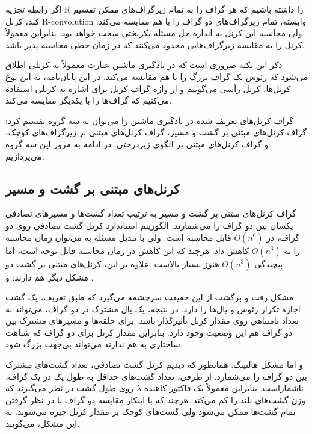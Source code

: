 اگر رابطه تجزیه R را داشته باشیم که هر گراف را به تمام زیرگراف‌های ممکن تقسیم کند، کرنل R-convolution وابسته، تمام زیرگراف‌های دو گراف را با هم مقایسه می‌کند. ولی محاسبه این کرنل به اندازه حل مسئله یکریختی سخت خواهد بود. بنابراین معمولاً کرنل را به مقایسه زیرگراف‌هایی محدود می‌کنند که در زمان خطی محاسبه پذیر باشد.

ذکر این نکته ضروری است که در یادگیری ماشین عبارت  معمولاً به کرنلی اطلاق می‌شود که رئوس یک گراف بزرگ را با هم مقایسه می‌کند. در این پایان‌نامه، به این نوع کرنل‌ها، کرنل رأسی می‌گوییم و از واژه گراف کرنل برای اشاره به کرنلی استفاده می‌کنیم که گراف‌ها را با یکدیگر مقایسه می‌کند.

گراف کرنل‌های تعریف شده در یادگیری ماشین را می‌توان به سه گروه تقسیم کرد: گراف کرنل‌های مبتنی بر گشت و مسیر، گراف کرنل‌های مبتنی بر زیرگراف‌های کوچک، و گراف کرنل‌های مبتنی بر الگوی زیردرختی. در ادامه به مرور این سه گروه می‌پردازیم.

\subsection{کرنل‌های مبتنی بر گشت و مسیر}\label{sec:random-walk-kernels}
گراف کرنل‌های مبتنی بر گشت و مسیر به ترتیب تعداد گشت‌ها و مسیرهای تصادفی یکسان بین دو گراف را می‌شمارند. الگوریتم استاندارد کرنل گشت تصادفی روی دو گراف، در $O(n^6)$  قابل محاسبه است. ولی با تبدیل مسئله به  می‌توان زمان محاسبه را به $O(n^3)$ کاهش داد. هرچند که این کاهش در زمان محاسبه قابل توجه است، اما پیچیدگی $O(n^3)$ هنوز بسیار بالاست. علاوه بر این، کرنل‌های مبتنی بر گشت دو مشکل دیگر هم دارند:  و .

مشکل رفت و برگشت از این حقیقت سرچشمه می‌گیرد که طبق تعریف، یک گشت اجازه تکرار رئوس و یال‌ها را دارد. در نتیجه، یک یال مشترک در دو گراف، می‌تواند به تعداد نامتناهی روی مقدار کرنل تأثیرگذار باشد. برای حلقه‌ها و مسیرهای مشترک بین دو گراف هم این وضعیت وجود دارد. بنابراین مقدار کرنل برای دو گراف که شباهت ساختاری به هم ندارند می‌تواند بی‌جهت بزرگ شود.

و اما مشکل هالتینگ. همانطور که دیدیم کرنل گشت تصادفی، تعداد  گشت‌های مشترک بین دو گراف را می‌شمارد. از طرفی، تعداد گشت‌های حداقل به طول یک در یک گراف، ناشماراست. بنابراین معمولاً یک فاکتور کاهنده $\lambda$ روی طول گشت در نظر می‌گیرند که وزن گشت‌های بلند را کم می‌کند. هرچند که با اینکار مقایسه دو گراف با در نظر گرفتن تمام گشت‌ها ممکن می‌شود ولی گشت‌های کوچک بر مقدار کرنل چیره می‌شوند. به این مشکل،  می‌گویند.

